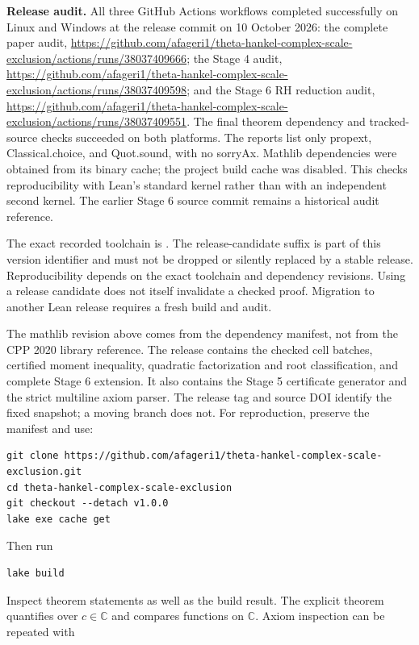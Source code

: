 \documentclass[
  11pt,
]{article}
\newcommand{\code}[1]{\texttt{\expandafter\seqsplit\expandafter{\detokenize{#1}}}}
\begin{document}
\textbf{Release audit.} All three GitHub Actions workflows completed successfully on Linux and Windows at the release commit on 10 October 2026: the complete paper audit, \url{https://github.com/afageri1/theta-hankel-complex-scale-exclusion/actions/runs/38037409666}; the Stage 4 audit, \url{https://github.com/afageri1/theta-hankel-complex-scale-exclusion/actions/runs/38037409598}; and the Stage 6 RH reduction audit, \url{https://github.com/afageri1/theta-hankel-complex-scale-exclusion/actions/runs/38037409551}. The final theorem dependency and tracked-source checks succeeded on both platforms. The reports list only propext, Classical.choice, and Quot.sound, with no sorryAx. Mathlib dependencies were obtained from its binary cache; the project build cache was disabled. This checks reproducibility with Lean's standard kernel rather than with an independent second kernel. The earlier Stage 6 source commit \code{b0218c813dd2f521a8d5a1752688b82c77b5e5dd} remains a historical audit reference.

The exact recorded toolchain is \texttt{}. The release-candidate suffix is part of this version identifier and must not be dropped or silently replaced by a stable release. Reproducibility depends on the exact toolchain and dependency revisions. Using a release candidate does not itself invalidate a checked proof. Migration to another Lean release requires a fresh build and audit.

The mathlib revision above comes from the dependency manifest, not from the CPP 2020 library reference. The release contains the checked cell batches, certified moment inequality, quadratic factorization and root classification, and complete Stage 6 extension. It also contains the Stage 5 certificate generator and the strict multiline axiom parser. The release tag and source DOI identify the fixed snapshot; a moving branch does not. For reproduction, preserve the manifest and use:

\begin{verbatim}
git clone https://github.com/afageri1/theta-hankel-complex-scale-exclusion.git
cd theta-hankel-complex-scale-exclusion
git checkout --detach v1.0.0
lake exe cache get
\end{verbatim}

Then run

\begin{verbatim}
lake build
\end{verbatim}

Inspect theorem statements as well as the build result. The explicit theorem quantifies over \(c \in \mathbb{C}\) and compares functions on \(\mathbb{C}\). Axiom inspection can be repeated with
\end{document}
